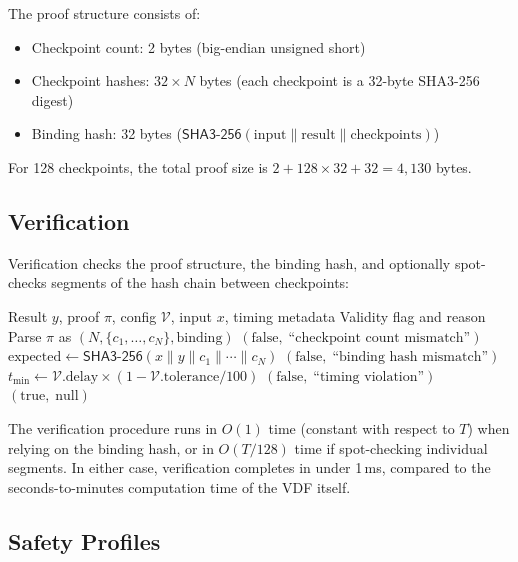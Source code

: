 \documentclass[conference,10pt]{IEEEtran}
\newcommand{\SHAthree}{\textsf{SHA3-256}}
\begin{document}
The proof structure consists of:
\begin{itemize}
  \item Checkpoint count: 2 bytes (big-endian unsigned short)
  \item Checkpoint hashes: $32 \times N$ bytes (each checkpoint is a 32-byte SHA3-256 digest)
  \item Binding hash: 32 bytes ($\SHAthree{}(\text{input} \| \text{result} \| \text{checkpoints})$)
\end{itemize}

For 128 checkpoints, the total proof size is $2 + 128 \times 32 + 32 = 4{,}130$ bytes.

\subsection{Verification}

Verification checks the proof structure, the binding hash, and optionally spot-checks segments of the hash chain between checkpoints:

\begin{algorithm}[t]
\caption{VDF Verification}
\label{alg:vdf_verify}
\begin{algorithmic}[1]
\REQUIRE Result $y$, proof $\pi$, config $\mathcal{V}$, input $x$, timing metadata
\ENSURE Validity flag and reason
\STATE Parse $\pi$ as $(N, \{c_1, \ldots, c_N\}, \text{binding})$
  \RETURN $(\text{false},\; \text{``checkpoint count mismatch''})$
\ENDIF
\STATE $\text{expected} \gets \SHAthree{}(x \| y \| c_1 \| \cdots \| c_N)$
  \RETURN $(\text{false},\; \text{``binding hash mismatch''})$
\ENDIF
\STATE $t_{\min} \gets \mathcal{V}.\text{delay} \times (1 - \mathcal{V}.\text{tolerance}/100)$
  \RETURN $(\text{false},\; \text{``timing violation''})$
\ENDIF
\RETURN $(\text{true},\; \text{null})$
\end{algorithmic}
\end{algorithm}

The verification procedure runs in $O(1)$ time (constant with respect to $T$) when relying on the binding hash, or in $O(T/128)$ time if spot-checking individual segments. In either case, verification completes in under 1\,ms, compared to the seconds-to-minutes computation time of the VDF itself.

\subsection{Safety Profiles}
\end{document}
